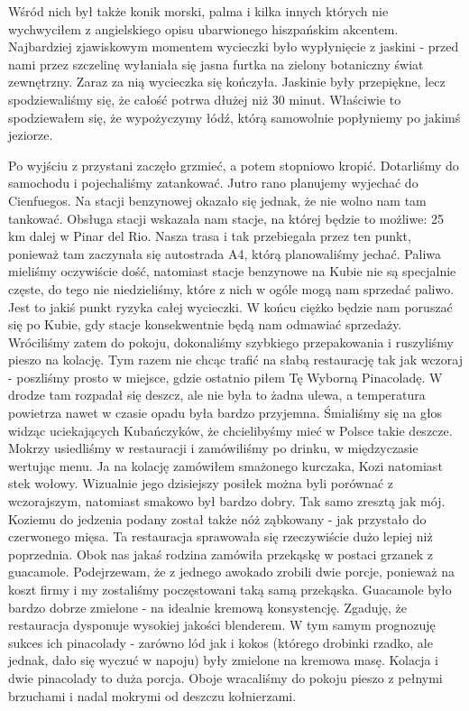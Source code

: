 Wśród nich był także konik morski, palma i kilka innych których nie wychwyciłem z angielskiego opisu ubarwionego hiszpańskim akcentem.
Najbardziej zjawiskowym momentem wycieczki było wypłynięcie z jaskini - przed nami przez szczelinę wyłaniała się jasna furtka na zielony botaniczny świat zewnętrzny.
Zaraz za nią wycieczka się kończyła.
Jaskinie były przepiękne, lecz spodziewaliśmy się, że całość potrwa dłużej niż 30 minut.
Właściwie to spodziewałem się, że wypożyczymy łódź, którą samowolnie popłyniemy po jakimś jeziorze.
\par Po wyjściu z przystani zaczęło grzmieć, a potem stopniowo kropić.
Dotarliśmy do samochodu i pojechaliśmy zatankować.
Jutro rano planujemy wyjechać do Cienfuegos.
Na stacji benzynowej okazało się jednak, że nie wolno nam tam tankować.
Obsługa stacji wskazała nam stacje, na której będzie to możliwe: 25 km dalej w Pinar del Rio.
Nasza trasa i tak przebiegała przez ten punkt, ponieważ tam zaczynała się autostrada A4, którą planowaliśmy jechać.
Paliwa mieliśmy oczywiście dość, natomiast stacje benzynowe na Kubie nie są specjalnie częste, do tego nie niedzieliśmy, które z nich w ogóle mogą nam sprzedać paliwo.
Jest to jakiś punkt ryzyka całej wycieczki.
W końcu ciężko będzie nam poruszać się po Kubie, gdy stacje konsekwentnie będą nam odmawiać sprzedaży.
Wróciliśmy zatem do pokoju, dokonaliśmy szybkiego przepakowania i ruszyliśmy pieszo na kolację.
Tym razem nie chcąc trafić na słabą restaurację tak jak wczoraj - poszliśmy prosto w miejsce, gdzie ostatnio piłem Tę Wyborną Pinacoladę.
W drodze tam rozpadał się deszcz, ale nie była to żadna ulewa, a temperatura powietrza nawet w czasie opadu była bardzo przyjemna.
Śmialiśmy się na głos widząc uciekających Kubańczyków, że chcielibyśmy mieć w Polsce takie deszcze.
Mokrzy usiedliśmy w restauracji i zamówiliśmy po drinku, w międzyczasie wertując menu.
Ja na kolację zamówiłem smażonego kurczaka, Kozi natomiast stek wołowy.
Wizualnie jego dzisiejszy posiłek można byli porównać z wczorajszym, natomiast smakowo był bardzo dobry.
Tak samo zresztą jak mój.
Koziemu do jedzenia podany został także nóż ząbkowany - jak przystało do czerwonego mięsa.
Ta restauracja sprawowała się rzeczywiście dużo lepiej niż poprzednia.
Obok nas jakaś rodzina zamówiła przekąskę w postaci grzanek z guacamole.
Podejrzewam, że z jednego awokado zrobili dwie porcje, ponieważ na koszt firmy i my zostaliśmy poczęstowani taką samą przekąska.
Guacamole było bardzo dobrze zmielone - na idealnie kremową konsystencję.
Zgaduję, że restauracja dysponuje wysokiej jakości blenderem.
W tym samym prognozuję sukces ich pinacolady - zarówno lód jak i kokos (którego drobinki rzadko, ale jednak, dało się wyczuć w napoju) były zmielone na kremowa masę.
Kolacja i dwie pinacolady to duża porcja.
Oboje wracaliśmy do pokoju pieszo z pełnymi brzuchami i nadal mokrymi od deszczu kołnierzami.